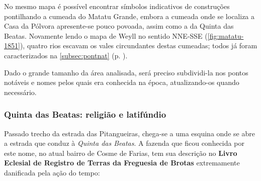  
No mesmo mapa é possível encontrar símbolos indicativos de construções pontilhando a cumeada do Matatu Grande, embora a cumeada onde se localiza a Casa da Pólvora apresente-se pouco povoada, assim como a da Quinta das Beatas. Novamente lendo o mapa de Weyll no sentido NNE-SSE (\autoref{fig:matatu-1851}), quatro rios escavam os vales circundantes destas cumeadas; todos já foram caracterizados na \autoref{subsec:pontnat} (p. \pageref{subsec:pontnat}). 

Dado o grande tamanho da área analisada, será preciso subdividi-la nos pontos notáveis e nomes pelos quais era conhecida na época, atualizando-os quando necessário.

\subsubsection{Quinta das Beatas: religião e latifúndio}\label{subsubsec:beatas}

Passado trecho da estrada das Pitangueiras, chega-se a uma esquina onde se abre a estrada que conduz à \textit{Quinta das Beatas}. A fazenda que ficou conhecida por este nome, no atual bairro de Cosme de Farias, tem sua descrição no \textbf{Livro Eclesial de Registro de Terras da Freguesia de Brotas} extremamente danificada pela ação do tempo:

